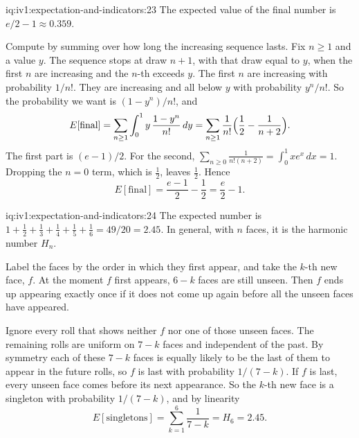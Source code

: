 \begin{solution}{iq:iv1:expectation-and-indicators:23}
The expected value of the final number is $e/2 - 1 \approx 0.359$.

Compute by summing over how long the increasing sequence lasts. Fix $n \ge 1$ and a value $y$. The sequence stops at draw $n+1$, with that draw equal to $y$, when the first $n$ are increasing and the $n$-th exceeds $y$. The first $n$ are increasing with probability $1/n!$. They are
increasing and all below $y$ with probability $y^n/n!$. So the probability we want is $(1 - y^n)/n!$, and
\[
E[\text{final}] = \sum_{n \ge 1} \int_0^1 y\,\frac{1 - y^n}{n!}\,dy = \sum_{n \ge 1} \frac{1}{n!}\Bigl(\frac12 - \frac{1}{n+2}\Bigr).
\]
The first part is $(e-1)/2$. For the second, $\sum_{n \ge 0} \frac{1}{n!(n+2)} = \int_0^1 x e^x\,dx = 1$. Dropping the $n = 0$ term, which is $\tfrac12$, leaves $\tfrac12$. Hence
\[
E[\text{final}] = \frac{e - 1}{2} - \frac12 = \frac{e}{2} - 1.
\]
\end{solution}

\begin{solution}{iq:iv1:expectation-and-indicators:24}
The expected number is $1 + \tfrac12 + \tfrac13 + \tfrac14 + \tfrac15 + \tfrac16 = 49/20 = 2.45$. In general, with $n$ faces, it is the harmonic number $H_n$.

Label the faces by the order in which they first appear, and take the $k$-th new face, $f$. At the moment $f$ first appears, $6 - k$ faces are still unseen. Then $f$ ends up appearing exactly once if it does not come up again before all the unseen faces have appeared.

Ignore every roll that shows neither $f$ nor one of those unseen faces. The remaining rolls are uniform on $7 - k$ faces and independent of the past. By symmetry each of these $7 - k$ faces is equally likely to be the last of them to appear in the future rolls, so $f$ is last with probability $1/(7-k)$. If $f$ is last, every unseen face comes before its next appearance. So the $k$-th new face is a singleton with probability $1/(7-k)$, and by linearity
\[
E[\text{singletons}] = \sum_{k=1}^{6} \frac{1}{7-k} = H_6 = 2.45.
\]
\end{solution}

